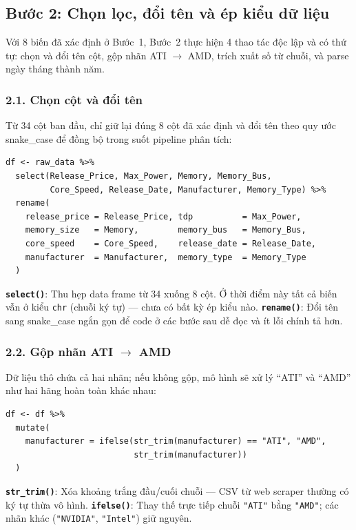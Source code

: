 \documentclass[a4paper]{article}
\begin{document}
\subsection{Bước 2: Chọn lọc, đổi tên và ép kiểu dữ liệu}

Với 8 biến đã xác định ở Bước~1, Bước~2 thực hiện 4 thao tác độc lập và có thứ tự: chọn và đổi tên cột, gộp nhãn ATI $\to$ AMD, trích xuất số từ chuỗi, và parse ngày tháng thành năm.

\subsubsection*{2.1. Chọn cột và đổi tên}

Từ 34 cột ban đầu, chỉ giữ lại đúng 8 cột đã xác định và đổi tên theo quy ước snake\_case để đồng bộ trong suốt pipeline phân tích:

\begin{verbatim}
df <- raw_data %>%
  select(Release_Price, Max_Power, Memory, Memory_Bus,
         Core_Speed, Release_Date, Manufacturer, Memory_Type) %>%
  rename(
    release_price = Release_Price, tdp          = Max_Power,
    memory_size   = Memory,        memory_bus   = Memory_Bus,
    core_speed    = Core_Speed,    release_date = Release_Date,
    manufacturer  = Manufacturer,  memory_type  = Memory_Type
  )
\end{verbatim}

\textbf{\texttt{select()}}: Thu hẹp data frame từ 34 xuống 8 cột. Ở thời điểm này tất cả biến vẫn ở kiểu \texttt{chr} (chuỗi ký tự) --- chưa có bất kỳ ép kiểu nào. \textbf{\texttt{rename()}}: Đổi tên sang snake\_case ngắn gọn để code ở các bước sau dễ đọc và ít lỗi chính tả hơn.

\subsubsection*{2.2. Gộp nhãn ATI $\to$ AMD}

Dữ liệu thô chứa cả hai nhãn; nếu không gộp, mô hình sẽ xử lý ``ATI'' và ``AMD'' như hai hãng hoàn toàn khác nhau:

\begin{verbatim}
df <- df %>%
  mutate(
    manufacturer = ifelse(str_trim(manufacturer) == "ATI", "AMD",
                          str_trim(manufacturer))
  )
\end{verbatim}

\textbf{\texttt{str\_trim()}}: Xóa khoảng trắng đầu/cuối chuỗi --- CSV từ web scraper thường có ký tự thừa vô hình. \textbf{\texttt{ifelse()}}: Thay thế trực tiếp chuỗi \texttt{"ATI"} bằng \texttt{"AMD"}; các nhãn khác (\texttt{"NVIDIA"}, \texttt{"Intel"}) giữ nguyên.
\end{document}
